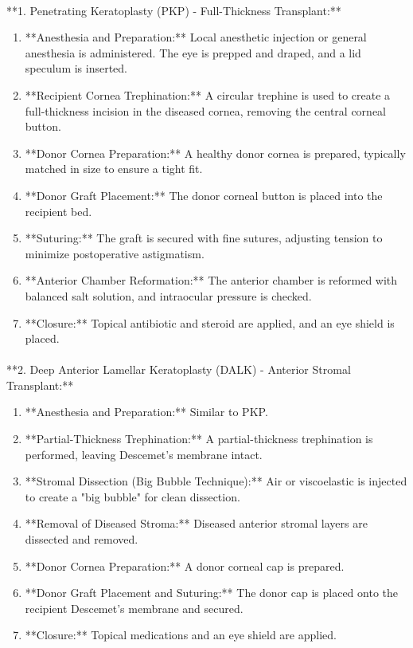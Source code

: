 \paragraph{}
**1. Penetrating Keratoplasty (PKP) - Full-Thickness Transplant:**
\begin{enumerate}
  \item **Anesthesia and Preparation:** Local anesthetic injection or general anesthesia is administered. The eye is prepped and draped, and a lid speculum is inserted.
  \item **Recipient Cornea Trephination:** A circular trephine is used to create a full-thickness incision in the diseased cornea, removing the central corneal button.
  \item **Donor Cornea Preparation:** A healthy donor cornea is prepared, typically matched in size to ensure a tight fit.
  \item **Donor Graft Placement:** The donor corneal button is placed into the recipient bed.
  \item **Suturing:** The graft is secured with fine sutures, adjusting tension to minimize postoperative astigmatism.
  \item **Anterior Chamber Reformation:** The anterior chamber is reformed with balanced salt solution, and intraocular pressure is checked.
  \item **Closure:** Topical antibiotic and steroid are applied, and an eye shield is placed.
\end{enumerate}

\paragraph{}
**2. Deep Anterior Lamellar Keratoplasty (DALK) - Anterior Stromal Transplant:**
\begin{enumerate}
  \item **Anesthesia and Preparation:** Similar to PKP.
  \item **Partial-Thickness Trephination:** A partial-thickness trephination is performed, leaving Descemet's membrane intact.
  \item **Stromal Dissection (Big Bubble Technique):** Air or viscoelastic is injected to create a "big bubble" for clean dissection.
  \item **Removal of Diseased Stroma:** Diseased anterior stromal layers are dissected and removed.
  \item **Donor Cornea Preparation:** A donor corneal cap is prepared.
  \item **Donor Graft Placement and Suturing:** The donor cap is placed onto the recipient Descemet's membrane and secured.
  \item **Closure:** Topical medications and an eye shield are applied.
\end{enumerate}

